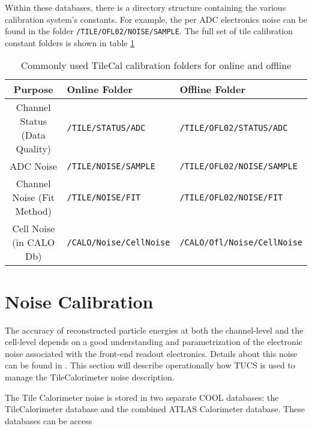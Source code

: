\documentclass[11pt,a4paper]{atlasnote}
\begin{document}
\par Within these databases, there is a directory structure containing the various calibration system's constants.  For example, the per ADC electronics noise can be found in the folder {\tt /TILE/OFL02/NOISE/SAMPLE}.  The full set of tile calibration constant folders is shown in table \ref{tab:COOLfolders}


\begin{table}[htbp]
   \centering
   \begin{tabular}{c l l}
   \hline \hline
     Purpose & Online Folder & Offline Folder \\
     \hline
     Channel Status (Data Quality) & {\tt /TILE/STATUS/ADC} & {\tt /TILE/OFL02/STATUS/ADC} \\
     ADC Noise & {\tt /TILE/NOISE/SAMPLE} & {\tt /TILE/OFL02/NOISE/SAMPLE} \\
     Channel Noise (Fit Method) &  {\tt /TILE/NOISE/FIT} & {\tt /TILE/OFL02/NOISE/FIT} \\
     Cell Noise (in CALO Db) & {\tt /CALO/Noise/CellNoise} & {\tt /CALO/Ofl/Noise/CellNoise} \\
     \hline \hline
   \end{tabular}
      \caption{Commonly used TileCal calibration folders  for online and offline}
   \label{tab:COOLfolders}
\end{table}


\section{Noise Calibration}
The accuracy of reconstructed particle energies at both the channel-level and the cell-level depends on a good understanding and parametrization of the electronic noise associated with the front-end readout electronics.  Details about this noise can be found in \cite{Tile-noise}.  This section will describe operationally how TUCS is used to manage the TileCalorimeter noise description.

\par The Tile Calorimeter noise is stored in two separate COOL databases: the TileCalorimeter database and the combined ATLAS Calorimeter database.  These databases can be access




\end{document}
